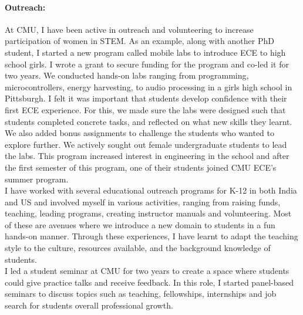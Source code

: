 \documentclass[10pt]{article}
\begin{document}
 \paragraph{Outreach: } 
 At CMU, I have been active in outreach and volunteering to increase participation of women in STEM. %
As an example, along with another PhD student, I started a new program called mobile labs to introduce ECE to high school girls. I wrote a grant to secure funding for the program and co-led it for two years. We conducted hands-on labs ranging from programming, microcontrollers, energy harvesting, to audio processing in a girls high school in Pittsburgh. I felt it was important that students develop confidence with their first ECE experience. For this, we made sure the labs were designed such that students completed concrete tasks, and reflected on what new skills they learnt. We also added bonus assignments to challenge the students who wanted to explore further. We actively sought out female undergraduate students to lead the labs. This program increased interest in engineering in the school and after the first semester of this program, one of their students joined CMU ECE's summer program. \\

I have worked with several educational outreach programs for K-12 in both India and US and involved myself in various activities, ranging from raising funds, teaching, leading programs, creating instructor manuals and volunteering. Most of these are avenues where we introduce a new domain to students in a fun hands-on manner. Through these experiences, I have learnt to adapt the teaching style to the culture, resources available, and the background knowledge of students. \\

I led a student seminar at CMU for two years to create a space where students could give practice talks and receive feedback. In this role, I started panel-based seminars to discuss topics such as teaching, fellowships, internships and job search for students overall professional growth. 
\end{document}
